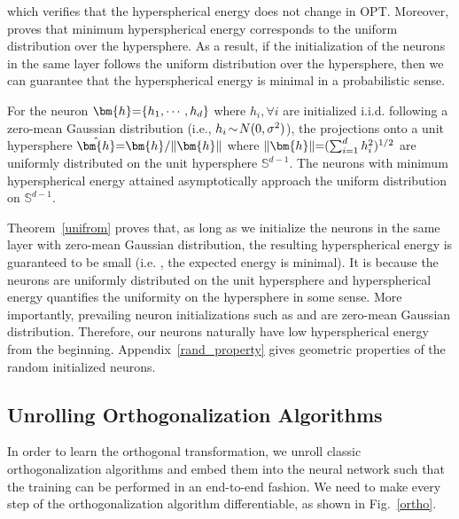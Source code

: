  which verifies that the hyperspherical energy does not change in OPT. Moreover, \cite{liu2018learning} proves that minimum hyperspherical energy corresponds to the uniform distribution over the hypersphere. As a result, if the initialization of the neurons in the same layer follows the uniform distribution over the hypersphere, then we can guarantee that the hyperspherical energy is minimal in a probabilistic sense.

\begin{theorem}\label{unifrom}
For the neuron $\thickmuskip=0mu \medmuskip=0mu \bm{h}=\{h_1,\cdots,h_d\}$ where $h_i,\forall i$ are initialized i.i.d. following a zero-mean Gaussian distribution (i.e., $\thickmuskip=2mu \medmuskip=2mu h_i \sim N(0,\sigma^2)$), the projections onto a unit hypersphere $\thickmuskip=0mu \medmuskip=0mu \hat{\bm{h}}=\bm{h}/\|\bm{h}\|$ where $\thickmuskip=0mu \medmuskip=0mu \|\bm{h}\|=(\sum_{i=1}^d h_i^2)^{1/2}$ are uniformly distributed on the unit hypersphere $\mathbb{S}^{d-1}$. The neurons with minimum hyperspherical energy attained asymptotically approach the uniform distribution on $\mathbb{S}^{d-1}$.
\end{theorem}

Theorem~\ref{unifrom} proves that, as long as we initialize the neurons in the same layer with zero-mean Gaussian distribution, the resulting hyperspherical energy is guaranteed to be small (i.e. , the expected energy is minimal). It is because the neurons are uniformly distributed on the unit hypersphere and hyperspherical energy quantifies the uniformity on the hypersphere in some sense. More importantly, prevailing neuron initializations such as \cite{glorot2010understanding} and \cite{he2015delving} are zero-mean Gaussian distribution. Therefore, our neurons naturally have low hyperspherical energy from the beginning. Appendix~\ref{rand_property} gives geometric properties of the random initialized neurons.

\subsection{Unrolling Orthogonalization Algorithms}

In order to learn the orthogonal transformation, we unroll classic orthogonalization algorithms and embed them into the neural network such that the training can be performed in an end-to-end fashion. We need to make every step of the orthogonalization algorithm differentiable, as shown in Fig.~\ref{ortho}.

